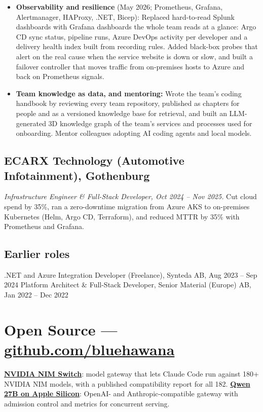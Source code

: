 \documentclass[a4paper,10pt]{article}
\begin{document}
\begin{itemize}
  \item \textbf{Observability and resilience} (May 2026; Prometheus, Grafana, Alertmanager, HAProxy, .NET, Bicep): Replaced hard-to-read Splunk dashboards with Grafana dashboards the whole team reads at a glance: Argo CD sync status, pipeline runs, Azure DevOps activity per developer and a delivery health index built from recording rules. Added black-box probes that alert on the real cause when the service website is down or slow, and built a failover controller that moves traffic from on-premises hosts to Azure and back on Prometheus signals.

  \item \textbf{Team knowledge as data, and mentoring:} Wrote the team's coding handbook by reviewing every team repository, published as chapters for people and as a versioned knowledge base for retrieval, and built an LLM-generated 3D knowledge graph of the team's services and processes used for onboarding. Mentor colleagues adopting AI coding agents and local models.

\end{itemize}


\subsection*{ECARX Technology (Automotive Infotainment), Gothenburg}
\textit{Infrastructure Engineer \& Full-Stack Developer, Oct 2024 -- Nov 2025.} Cut cloud spend by 35\%, ran a zero-downtime migration from Azure AKS to on-premises Kubernetes (Helm, Argo CD, Terraform), and reduced MTTR by 35\% with Prometheus and Grafana.


\subsection*{Earlier roles}
.NET and Azure Integration Developer (Freelance), Synteda AB, Aug 2023 -- Sep 2024 \textbar{} Platform Architect \& Full-Stack Developer, Senior Material (Europe) AB, Jan 2022 -- Dec 2022



\section*{Open Source --- \href{https://github.com/bluehawana}{github.com/bluehawana}}
\textbf{\href{https://github.com/bluehawana/nvidia-nim-switch-python}{NVIDIA NIM Switch}}: model gateway that lets Claude Code run against 180+ NVIDIA NIM models, with a published compatibility report for all 182. \textbf{\href{https://github.com/bluehawana/Qwen3.827B-SGLang-mpbm5max}{Qwen 27B on Apple Silicon}}: OpenAI- and Anthropic-compatible gateway with admission control and metrics for concurrent serving.
\end{document}
